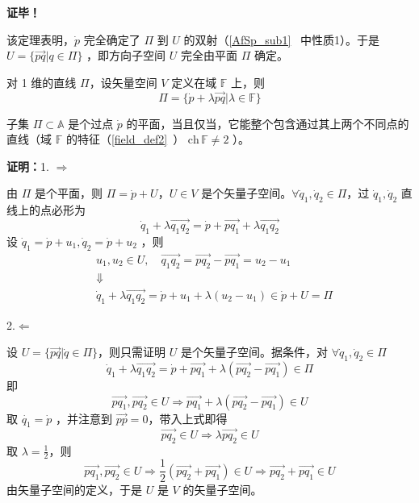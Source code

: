 \textbf{证毕！}

该定理表明，$\dot p$ 完全确定了 $\Pi$ 到 $U$ 的双射（\autoref{AfSp_sub1}~ 中性质1）。于是 $U=\{\overrightarrow{pq}|q\in \Pi\}$ ，即方向子空间 $U$ 完全由平面 $\Pi$ 确定。

对 1 维的直线 $\Pi$，设矢量空间 $V$ 定义在域 $\mathbb F$ 上，则
\begin{equation}\label{SAfSp_eq4}
\Pi=\{\dot p+\lambda\overrightarrow{pq}|\lambda\in \mathbb F\}
\end{equation}
\begin{theorem}{}
子集 $\Pi \subset\mathbb A$ 是个过点 $\dot p$ 的平面，当且仅当，它能整个包含通过其上两个不同点的直线（域 $\mathbb F$ 的特征（\autoref{field_def2}~） $\mathrm{ch}\,\mathbb F\neq 2$ ）。
\end{theorem}
\textbf{证明：}1.
$\Rightarrow$

由 $\Pi$ 是个平面，则 $\Pi=\dot p+U$，$U\in V$ 是个矢量子空间。$\forall\dot q_1,\dot q_2\in \Pi$，过 $\dot q_1,\dot q_2$ 直线上的点必形为
\begin{equation}
\dot q_1+\lambda\overrightarrow{q_1q_2}=\dot p+\overrightarrow{pq_1}+\lambda\overrightarrow{q_1q_2}
\end{equation}
设 $\dot q_1=\dot p+u_1,\dot q_2=\dot p+u_2$ ，则
\begin{equation}
\begin{aligned}
&u_1,u_2\in U,\quad \overrightarrow{q_1q_2}=\overrightarrow{pq_2}-\overrightarrow{pq_1}=u_2-u_1\\
&\Downarrow\\
&\dot q_1+\lambda\overrightarrow{q_1q_2}=\dot p+u_1+\lambda(u_2-u_1)\in\dot p+U=\Pi
\end{aligned}
\end{equation}

2.$\Leftarrow$

设 $U=\{\overrightarrow{pq}|\dot q\in \Pi\}$，则只需证明 $U$ 是个矢量子空间。据条件，对 $\forall \dot q_1,\dot q_2\in\Pi$
\begin{equation}
\dot q_1+\lambda\overrightarrow{q_1q_2}=\dot p+\overrightarrow{pq_1}+\lambda(\overrightarrow{pq_2}-\overrightarrow{pq_1})\in\Pi
\end{equation}
 即
 \begin{equation}
 \overrightarrow{pq_1},\overrightarrow{pq_2}\in U\Rightarrow \overrightarrow{pq_1}+\lambda(\overrightarrow{pq_2}-\overrightarrow{pq_1})\in U
 \end{equation}
 取 $\dot{q_1}=\dot{p}$ ，并注意到 $\overrightarrow{pp}=0$，带入上式即得 
 \begin{equation}\label{SAfSp_eq2}
 \overrightarrow{pq_2}\in U\Rightarrow\lambda\overrightarrow{pq_2}\in U 
 \end{equation}
取 $\lambda=\frac{1}{2}$，则 
\begin{equation}
\overrightarrow{pq_1},\overrightarrow{pq_2}\in U\Rightarrow \frac{1}{2}(\overrightarrow{pq_2}+\overrightarrow{pq_1})\in U\Rightarrow \overrightarrow{pq_2}+\overrightarrow{pq_1}\in U
\end{equation}
由矢量子空间的定义，于是 $U$ 是 $V$ 的矢量子空间。

